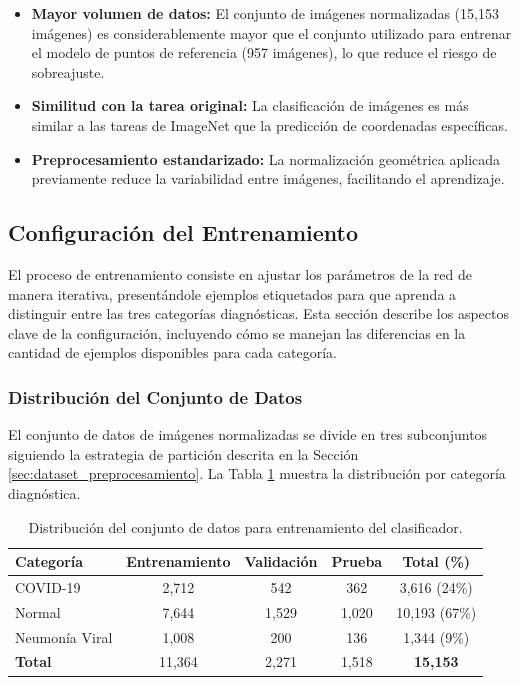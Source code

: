 \begin{itemize}
    \item \textbf{Mayor volumen de datos:} El conjunto de imágenes normalizadas (15,153 imágenes) es considerablemente mayor que el conjunto utilizado para entrenar el modelo de puntos de referencia (957 imágenes), lo que reduce el riesgo de sobreajuste.
    \item \textbf{Similitud con la tarea original:} La clasificación de imágenes es más similar a las tareas de ImageNet que la predicción de coordenadas específicas.
    \item \textbf{Preprocesamiento estandarizado:} La normalización geométrica aplicada previamente reduce la variabilidad entre imágenes, facilitando el aprendizaje.
\end{itemize}

\subsection{Configuración del Entrenamiento}
\label{subsec:config_entrenamiento_clasificador}

El proceso de entrenamiento consiste en ajustar los parámetros de la red de manera iterativa, presentándole ejemplos etiquetados para que aprenda a distinguir entre las tres categorías diagnósticas. Esta sección describe los aspectos clave de la configuración, incluyendo cómo se manejan las diferencias en la cantidad de ejemplos disponibles para cada categoría.

\subsubsection{Distribución del Conjunto de Datos}

El conjunto de datos de imágenes normalizadas se divide en tres subconjuntos siguiendo la estrategia de partición descrita en la Sección \ref{sec:dataset_preprocesamiento}. La Tabla \ref{tab:distribucion_clasificador} muestra la distribución por categoría diagnóstica.

\begin{table}[htbp]
    \centering
    \caption{Distribución del conjunto de datos para entrenamiento del clasificador.}
    \label{tab:distribucion_clasificador}
    \small
    \setlength{\tabcolsep}{2.5pt}
    \begin{tabular}{@{}p{2.5cm}cccc@{}}
        \toprule
        \textbf{Categoría} & \textbf{Entrenamiento} & \textbf{Validación} & \textbf{Prueba} & \textbf{Total (\%)} \\
        \midrule
        COVID-19 & 2,712 & 542 & 362 & 3,616 (24\%) \\
        Normal & 7,644 & 1,529 & 1,020 & 10,193 (67\%) \\
        Neumonía Viral & 1,008 & 200 & 136 & 1,344 (9\%) \\
        \midrule
        \textbf{Total} & 11,364 & 2,271 & 1,518 & \textbf{15,153} \\
        \bottomrule
    \end{tabular}
\end{table}

